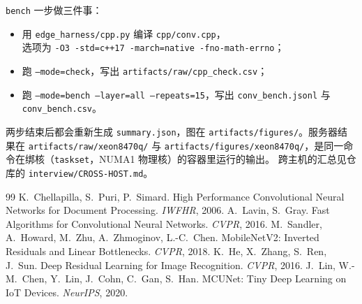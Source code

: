 \documentclass[11pt,a4paper]{ctexart}
\begin{document}
\texttt{bench} 一步做三件事：
\begin{itemize}
  \item 用 \nolinkurl{edge_harness/cpp.py} 编译 \nolinkurl{cpp/conv.cpp}，\\选项为 \texttt{-O3 -std=c++17 -march=native -fno-math-errno}；
  \item 跑 \texttt{--mode=check}，写出 \nolinkurl{artifacts/raw/cpp_check.csv}；
  \item 跑 \texttt{--mode=bench --layer=all --repeats=15}，写出 \nolinkurl{conv_bench.jsonl} 与 \nolinkurl{conv_bench.csv}。
\end{itemize}
两步结束后都会重新生成 \nolinkurl{summary.json}，图在 \nolinkurl{artifacts/figures/}。服务器结果在 \nolinkurl{artifacts/raw/xeon8470q/}
与 \nolinkurl{artifacts/figures/xeon8470q/}，是同一命令在绑核（\texttt{taskset}，NUMA1 物理核）的容器里运行的输出。
跨主机的汇总见仓库的 \nolinkurl{interview/CROSS-HOST.md}。


\begin{thebibliography}{99}
 K.~Chellapilla, S.~Puri, P.~Simard. High Performance Convolutional Neural Networks for Document Processing. \emph{IWFHR}, 2006.
 A.~Lavin, S.~Gray. Fast Algorithms for Convolutional Neural Networks. \emph{CVPR}, 2016.
 M.~Sandler, A.~Howard, M.~Zhu, A.~Zhmoginov, L.-C.~Chen. MobileNetV2: Inverted Residuals and Linear Bottlenecks. \emph{CVPR}, 2018.
 K.~He, X.~Zhang, S.~Ren, J.~Sun. Deep Residual Learning for Image Recognition. \emph{CVPR}, 2016.
 J.~Lin, W.-M.~Chen, Y.~Lin, J.~Cohn, C.~Gan, S.~Han. MCUNet: Tiny Deep Learning on IoT Devices. \emph{NeurIPS}, 2020.
\end{thebibliography}
\end{document}

